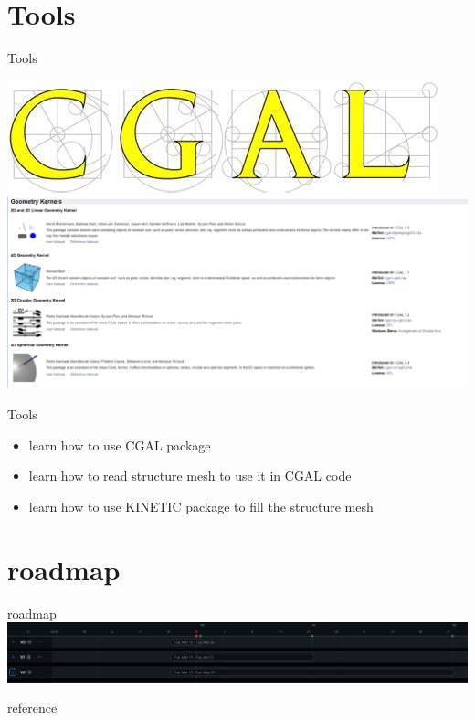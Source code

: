 \documentclass[10pt]{beamer}
\begin{document}
\section{Tools}
\begin{frame}{Tools}
    
    \includegraphics[scale = 0.2]{../../images/CGAL_logo.png}
    \includegraphics[scale =   0.3 ]{../../images/exemple.png}

\end{frame}



\begin{frame}[plain]{Tools}
    \begin{itemize}
        \item learn how to use CGAL package
        \item learn how to read structure mesh to use it in CGAL code
        \item learn how to use KINETIC package to fill the structure mesh  
    \end{itemize}
\end{frame}
\section{roadmap}

\begin{frame}{roadmap}
    \includegraphics[scale = 0.5]{../../images/roadmap.png}
\end{frame}
\begin{frame}{reference}
    \nocite{*}
    
    
\end{frame}
\end{document}
